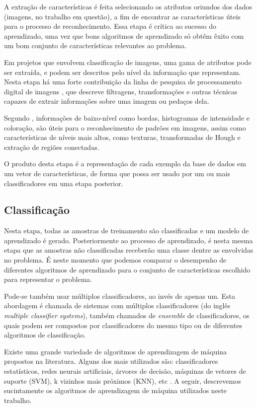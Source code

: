 A extração de características é feita selecionando os atributos oriundos dos dados (imagens, no trabalho em questão), a fim de encontrar as características úteis para o processo de reconhecimento. Essa etapa é crítica ao sucesso do aprendizado, uma vez que bons algoritmos de aprendizado só obtêm êxito com um bom conjunto de características relevantes ao problema.

Em projetos que envolvem classificação de imagens, uma gama de atributos pode ser extraída, e podem ser descritos pelo nível da informação que representam. Nesta etapa há uma forte contribuição da linha de pesquisa de processamento digital de imagens \cite{gonzalez:2002}, que descreve filtragens, transformações e outras técnicas capazes de extrair informações sobre uma imagem ou pedaços dela.

Segundo , informações de baixo-nível como bordas, histogramas de intensidade e coloração, são úteis para o reconhecimento de padrões em imagens, assim como características de níveis mais altos, como texturas, transformadas de Hough e extração de regiões conectadas.

O produto desta etapa é a representação de cada exemplo da base de dados em um vetor de características, de forma que possa ser usado por um ou mais classificadores em uma etapa posterior.


\subsection{Classificação}\label{sec:classificacao}

Nesta etapa, todas as amostras de treinamento são classificadas e um modelo de aprendizado é gerado. Posteriormente ao processo de aprendizado, é nesta mesma etapa que as amostras não classificadas receberão uma classe dentre as envolvidas no problema. É neste momento que podemos comparar o desempenho de diferentes algoritmos de aprendizado para o conjunto de características escolhido para representar o problema.

Pode-se também usar múltiplos classificadores, ao invés de apenas um. Esta abordagem é chamada de sistemas com múltiplos classificadores (do inglês \textit{multiple classifier systems}), também chamados de \textit{ensemble} de classificadores, os quais podem ser compostos por classificadores do mesmo tipo ou de diferentes algoritmos de classificação. 

Existe uma grande variedade de algoritmos de aprendizagem de máquina propostos na literatura. Alguns dos mais utilizados são: classificadores estatísticos, redes neurais artificiais, árvores de decisão, máquinas de vetores de suporte (SVM), k vizinhos mais próximos (KNN), etc \cite{jain:1989}. A seguir, descrevemos sucintamente os algoritmos de aprendizagem de máquina utilizados neste trabalho.

